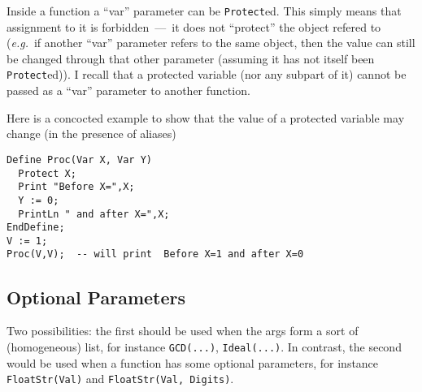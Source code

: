 \documentclass{book}[12,a4paper]
\def\eg{{\it e.g.}}
\begin{document}
Inside a function a ``var'' parameter can be \texttt{Protect}ed.  This simply
means that assignment to it is forbidden~---~it does not ``protect'' the
object refered to (\eg~if another ``var'' parameter refers to the same
object, then the value can still be changed through that other parameter
(assuming it has not itself been \texttt{Protect}ed)).  I recall that a
protected variable (nor any subpart of it) cannot be passed as a ``var''
parameter to another function.

Here is a concocted example to show that the value of a protected variable
may change (in the presence of aliases)
\begin{lstlisting}
Define Proc(Var X, Var Y)
  Protect X;
  Print "Before X=",X;
  Y := 0;
  PrintLn " and after X=",X;
EndDefine;
V := 1;
Proc(V,V);  -- will print  Before X=1 and after X=0
\end{lstlisting}


\subsection{Optional Parameters}
\label{global:optional}

Two possibilities: the first should be used when the args form a sort
of (homogeneous) list, for instance \texttt{GCD(...)},
\texttt{Ideal(...)}.  In contrast, the second would be used when a
function has some optional parameters, for instance
\texttt{FloatStr(Val)} and \texttt{FloatStr(Val, Digits)}.
\end{document}
